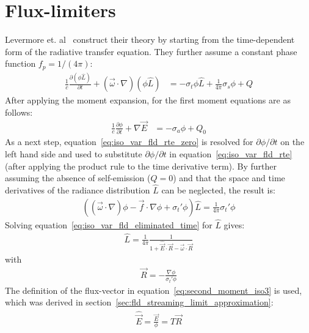 \section{Flux-limiters}
\label{sec:fld_vef_factors}

Levermore et. al~\cite{Levermore81} construct their theory by starting from the time-dependent form of the radiative transfer equation. They further assume a constant phase function $f_p=1/(4\pi)$:
\begin{align}
\label{eq:iso_var_fld_rte}
\frac{1}{c}\frac{\partial (\phi\hat{L})}{\partial t} + \left(\vec{\omega}\cdot\nabla\right)(\phi\hat{L})&=-\sigma_t\phi\hat{L} + \frac{1}{4\pi}\sigma_s\phi + Q
\end{align}
After applying the moment expansion, for the first moment equations are as follows:
\begin{align}
\label{eq:iso_var_fld_rte_zero}
\frac{1}{c}\frac{\partial \phi}{\partial t} + \nabla\vec{E} &= -\sigma_a\phi + Q_0
\end{align}
As a next step, equation~\ref{eq:iso_var_fld_rte_zero} is resolved for $\partial \phi/\partial t$ on the left hand side and used to substitute $\partial\phi/\partial t$ in equation~\ref{eq:iso_var_fld_rte} (after applying the product rule to the time derivative term). By further assuming the absence of self-emission ($Q=0$) and that the space and time derivatives of the radiance distribution $\hat{L}$ can be neglected, the result is:
\begin{align}
\label{eq:iso_var_fld_eliminated_time}
\left( \left(\vec{\omega}\cdot\nabla\right)\phi -\vec{f}\cdot\nabla\phi + \sigma_t'\phi\right)\hat{L} = \frac{1}{4\pi}\sigma_t'\phi
\end{align}
Solving equation~\ref{eq:iso_var_fld_eliminated_time} for $\hat{L}$ gives:
\begin{align}
\label{eq:iso_var_fld_Lhat}
\hat{L} = \frac{1}{4\pi}\frac{1}{1+\widehat{\vec{E}}\cdot\vec{R}-\vec{\omega}\cdot\vec{R}}
\end{align}
with
\begin{align}
\label{eq:iso_var_fld_R}
\vec{R} = -\frac{\nabla\phi}{\sigma_t'\phi}
\end{align}
The definition of the flux-vector in equation~\ref{eq:second_moment_iso3} is used, which was derived in section~\ref{sec:fld_streaming_limit_approximation}:
\begin{align}
\widehat{\vec{E}} = \frac{\vec{E}}{\phi}= T\vec{R}
\label{eq:iso_var_fld_normalized_flux}
\end{align}

